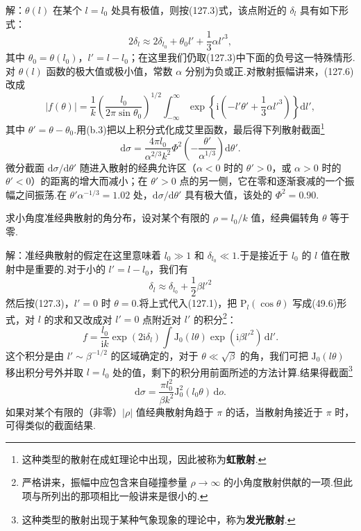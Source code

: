 \begin{xiti}
解：$\theta(l)$ 在某个 $l=l_0$ 处具有极值，则按(127.3)式，该点附近的 $\delta_l$ 具有如下形式：
\begin{equation*}
  2\delta_l\approx2\delta_{l_0}+\theta_0l'+\frac{1}{3}\alpha l'^3,
\end{equation*}
其中 $\theta_0=\theta(l_0)$，$l'=l-l_0$；在这里我们仍取(127.3)中下面的负号这一特殊情形.对 $\theta(l)$ 函数的极大值或极小值，常数 $\alpha$ 分别为负或正.对散射振幅讲来，(127.6)改成
\begin{equation*}
  |f(\theta)|=\frac{1}{k}\left(\frac{l_0}{2\pi\sin\theta_0}\right)^{1/2}
  \int_{-\infty}^{\infty}
  \exp\left\{\mathrm{i}\left(-l'\theta'
  +\frac{1}{3}\alpha l'^3\right)\right\}\mathrm{d}l',
\end{equation*}
其中 $\theta'=\theta-\theta_0$.用(b.3)把以上积分式化成艾里函数，最后得下列散射截面\footnote{这种类型的散射在成虹理论中出现，因此被称为\textbf{虹散射}.}
\begin{equation*}
  \mathrm{d}\sigma=\frac{4\pi l_0}{\alpha^{2/3}k^2}
  \Phi^2\left(-\frac{\theta'}{\alpha^{1/3}}\right)\mathrm{d}\theta'.
\end{equation*}
微分截面 $\mathrm{d}\sigma/\mathrm{d}\theta'$ 随进入散射的经典允许区（$\alpha<0$ 时的 $\theta'>0$，或 $\alpha>0$ 时的 $\theta'<0$）的距离的增大而减小；在 $\theta'>0$ 点的另一侧，它在零和逐渐衰减的一个振幅之间振荡.在 $\theta'\alpha^{-1/3}=1.02$ 处，$\mathrm{d}\sigma/\mathrm{d}\theta'$ 具有极大值，该处的 $\Phi^2=0.90$.

\quad 求小角度准经典散射的角分布，设对某个有限的 $\rho=l_0/k$ 值，经典偏转角 $\theta$ 等于零.

解：准经典散射的假定在这里意味着 $l_0\gg1$ 和 $\delta_{l_0}\ll1$.于是接近于 $l_0$ 的 $l$ 值在散射中是重要的.对于小的 $l'=l-l_0$，我们有
\begin{equation*}
  \delta_l\approx\delta_{l_0}+\frac{1}{2}\beta l'^2
\end{equation*}
然后按(127.3)，$l'=0$ 时 $\theta=0$.将上式代入(127.1)，把 $\mathrm{P}_l(\cos\theta)$ 写成(49.6)形式，对 $l$ 的求和又改成对 $l'=0$ 点附近对 $l'$ 的积分\footnote{严格讲来，振幅中应包含来自碰撞参量 $\rho\to\infty$ 的小角度散射供献的一项.但此项与所列出的那项相比一般讲来是很小的.}：
\begin{equation*}
  f=\frac{l_0}{\mathrm{i}k}\exp(2\mathrm{i}\delta_l)
  \int\mathrm{J}_0(l\theta)\exp(\mathrm{i}\beta l'^2)\,\mathrm{d}l'.
\end{equation*}
这个积分是由 $l'\sim\beta^{-1/2}$ 的区域确定的，对于 $\theta\ll\sqrt{\beta}$ 的角，我们可把 $\mathrm{J}_0(l\theta)$ 移出积分号外并取 $l=l_0$ 处的值，剩下的积分用前面所述的方法计算.结果得截面\footnote{这种类型的散射出现于某种气象现象的理论中，称为\textbf{发光散射}.}
\begin{equation*}
  \mathrm{d}\sigma=\frac{\pi l_0^2}{\beta k^2}
  \mathrm{J}_0^2(l_0\theta)\,\mathrm{d}o.
\end{equation*}
如果对某个有限的（非零）$|\rho|$ 值经典散射角趋于 $\pi$ 的话，当散射角接近于 $\pi$ 时，可得类似的截面结果.

\end{xiti}
\setcounter{equation}{0}%

